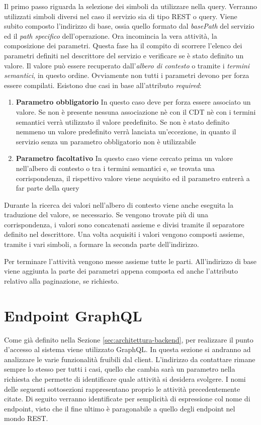 Il primo passo riguarda la selezione dei simboli da utilizzare nella query. Verranno utilizzati simboli diversi nel caso il servizio sia di tipo REST o query. Viene subito composto l'indirizzo di base, ossia quello formato dal \emph{basePath} del servizio ed il \emph{path specifico} dell'operazione. Ora incomincia la vera attività, la composizione dei parametri. Questa fase ha il compito di scorrere l'elenco dei parametri definiti nel descrittore del servizio e verificare se è stato definito un valore. Il valore può essere recuperato dall'\emph{albero di contesto} o tramite i \emph{termini semantici}, in questo ordine. Ovviamente non tutti i parametri devono per forza essere compilati. Esistono due casi in base all'attributo \emph{required}:

\begin{enumerate}
	\item \textbf{Parametro obbligatorio} In questo caso deve per forza essere associato un valore. Se non è presente nessuna associazione nè con il CDT nè con i termini semantici verrà utilizzato il valore predefinito. Se non è stato definito nemmeno un valore predefinito verrà lanciata un'eccezione, in quanto il servizio senza un parametro obbligatorio non è utilizzabile
	\item \textbf{Parametro facoltativo} In questo caso viene cercato prima un valore nell'albero di contesto o tra i termini semantici e, se trovata una corrispondenza, il rispettivo valore viene acquisito ed il parametro entrerà a far parte della query
\end{enumerate}

Durante la ricerca dei valori nell'albero di contesto viene anche eseguita la traduzione del valore, se necessario. Se vengono trovate più di una corrispondenza, i valori sono concatenati assieme e divisi tramite il separatore definito nel descrittore. Una volta acquisiti i valori vengono composti assieme, tramite i vari simboli, a formare la seconda parte dell'indirizzo.

Per terminare l'attività vengono messe assieme tutte le parti. All'indirizzo di base viene aggiunta la parte dei parametri appena composta ed anche l'attributo relativo alla paginazione, se richiesto.

\section{Endpoint GraphQL\label{sec:endpoint-graphql}}

Come già definito nella Sezione \ref{sec:architettura-backend}, per realizzare il punto d'accesso al sistema viene utilizzato GraphQL. In questa sezione si andranno ad analizzare le varie funzionalità fruibili dal client. L'indirizzo da contattare rimane sempre lo stesso per tutti i casi, quello che cambia sarà un parametro nella richiesta che permette di identificare quale attività si desidera svolgere. I nomi delle seguenti sottosezioni rappresentano proprio le attività precedentemente citate. Di seguito verranno identificate per semplicità di espressione col nome di endpoint, visto che il fine ultimo è paragonabile a quello degli endpoint nel mondo REST.

